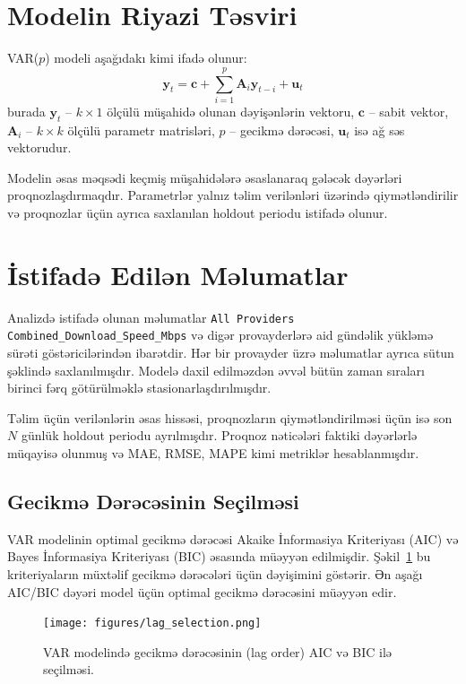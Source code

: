 \documentclass[12pt,a4paper]{article}
\begin{document}
\section{Modelin Riyazi Təsviri}
VAR($p$) modeli aşağıdakı kimi ifadə olunur:
\begin{equation}
    \mathbf{y}_t = \mathbf{c} + \sum_{i=1}^{p} \mathbf{A}_i \mathbf{y}_{t-i} + \mathbf{u}_t
    \label{eq:var}
\end{equation}
burada $\mathbf{y}_t$ -- $k \times 1$ ölçülü müşahidə olunan dəyişənlərin vektoru, $\mathbf{c}$ -- sabit vektor, $\mathbf{A}_i$ -- $k \times k$ ölçülü parametr matrisləri, $p$ -- gecikmə dərəcəsi, $\mathbf{u}_t$ isə ağ səs vektorudur.

Modelin əsas məqsədi keçmiş müşahidələrə əsaslanaraq gələcək dəyərləri proqnozlaşdırmaqdır. Parametrlər yalnız təlim verilənləri üzərində qiymətləndirilir və proqnozlar üçün ayrıca saxlanılan holdout periodu istifadə olunur.

\section{İstifadə Edilən Məlumatlar}
Analizdə istifadə olunan məlumatlar \texttt{All Providers Combined\_Download\_Speed\_Mbps} və digər provayderlərə aid gündəlik yükləmə sürəti göstəricilərindən ibarətdir. Hər bir provayder üzrə məlumatlar ayrıca sütun şəklində saxlanılmışdır. Modelə daxil edilməzdən əvvəl bütün zaman sıraları birinci fərq götürülməklə stasionarlaşdırılmışdır.

Təlim üçün verilənlərin əsas hissəsi, proqnozların qiymətləndirilməsi üçün isə son $N$ günlük holdout periodu ayrılmışdır. Proqnoz nəticələri faktiki dəyərlərlə müqayisə olunmuş və MAE, RMSE, MAPE kimi metriklər hesablanmışdır.

\subsection{Gecikmə Dərəcəsinin Seçilməsi}
VAR modelinin optimal gecikmə dərəcəsi Akaike İnformasiya Kriteriyası (AIC) və Bayes İnformasiya Kriteriyası (BIC) əsasında müəyyən edilmişdir. Şəkil~\ref{fig:lag_selection} bu kriteriyaların müxtəlif gecikmə dərəcələri üçün dəyişimini göstərir. Ən aşağı AIC/BIC dəyəri model üçün optimal gecikmə dərəcəsini müəyyən edir.

\begin{figure}[h!]
    \centering
    \texttt{[image: figures/lag\_selection.png]}
    \caption{VAR modelində gecikmə dərəcəsinin (lag order) AIC və BIC ilə seçilməsi.}
    \label{fig:lag_selection}
\end{figure}
\end{document}
